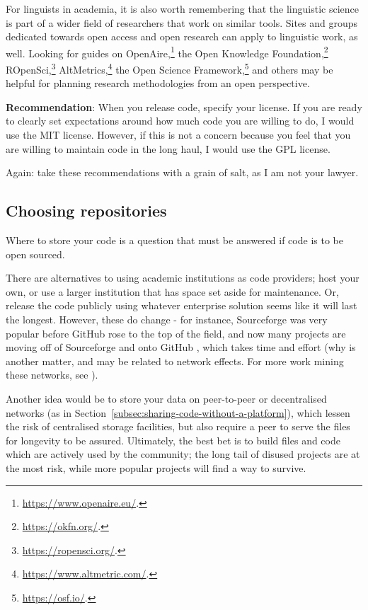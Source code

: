 For linguists in academia, it is also worth remembering that the linguistic science is part of a wider field of researchers that work on similar tools. Sites and groups dedicated towards open access and open research can apply to linguistic work, as well. Looking for guides on OpenAire,\footnote{\href{https://www.openaire.eu/}{https://www.openaire.eu/}. } the Open Knowledge Foundation,\footnote{\href{https://okfn.org/}{https://okfn.org/}. } ROpenSci,\footnote{\href{https://ropensci.org/}{https://ropensci.org/}. } AltMetrics,\footnote{\href{https://www.altmetric.com/}{https://www.altmetric.com/}. } the Open Science Framework,\footnote{\href{https://osf.io/}{https://osf.io/}. } and others may be helpful for planning research methodologies from an open perspective.

\textbf{Recommendation}: When you release code, specify your license. If you are ready to clearly set expectations around how much code you are willing to do, I would use the MIT license. However, if this is not a concern because you feel that you are willing to maintain code in the long haul, I would use the GPL license.

Again: take these recommendations with a grain of salt, as I am not your lawyer.

\subsection{Choosing repositories}
\label{choosing-repositories}

Where to store your code is a question that must be answered if code is to be open sourced.

There are alternatives to using academic institutions as code providers; host your own, or use a larger institution that has space set aside for maintenance. Or, release the code publicly using whatever enterprise solution seems like it will last the longest. However, these do change - for instance, Sourceforge was very popular before GitHub rose to the top of the field, and now many projects are moving off of Sourceforge and onto GitHub \citep{finley2011github}, which takes time and effort (why is another matter, and may be related to network effects. For more work mining these networks, see \citet{thung2013network, kalliamvakou2014promises}).

Another idea would be to store your data on peer-to-peer or decentralised networks (as in Section~\ref{subsec:sharing-code-without-a-platform}), which lessen the risk of centralised storage facilities, but also require a peer to serve the files for longevity to be assured. Ultimately, the best bet is to build files and code which are actively used by the community; the long tail of disused projects are at the most risk, while more popular projects will find a way to survive.

